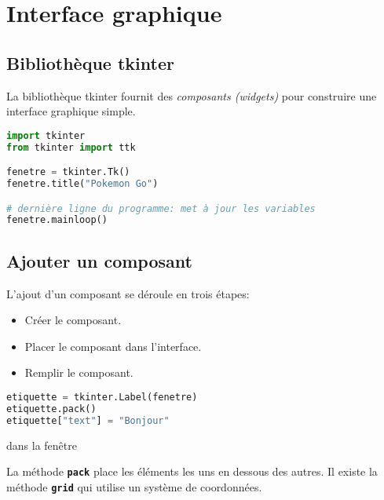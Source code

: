 \documentclass[a4paper,11pt]{article}
\begin{document}
\section{Interface graphique}
\subsection{Bibliothèque tkinter}
La bibliothèque tkinter fournit des \emph{composants (widgets)} pour construire une interface graphique simple.
\begin{center}
\begin{lstlisting}[language=Python]
import tkinter
from tkinter import ttk

fenetre = tkinter.Tk()
fenetre.title("Pokemon Go")

# dernière ligne du programme: met à jour les variables 
fenetre.mainloop()
\end{lstlisting}
\label{interface}
\end{center}
\subsection{Ajouter un composant}
L'ajout d'un composant se déroule en trois étapes:
\begin{itemize}
    \item Créer le composant.
    \item Placer le composant dans l'interface.
    \item Remplir le composant.
\end{itemize}
\begin{center}
\begin{lstlisting}[language=Python]
etiquette = tkinter.Label(fenetre)
etiquette.pack()
etiquette["text"] = "Bonjour"
\end{lstlisting}
 dans la fenêtre
\label{label}
\end{center}
\begin{aretenir}[Commentaire]
La méthode \textbf{\texttt{pack}} place les éléments les uns en dessous des autres. Il existe la méthode \textbf{\texttt{grid}} qui utilise un système de coordonnées.
\end{aretenir}
\end{document}

